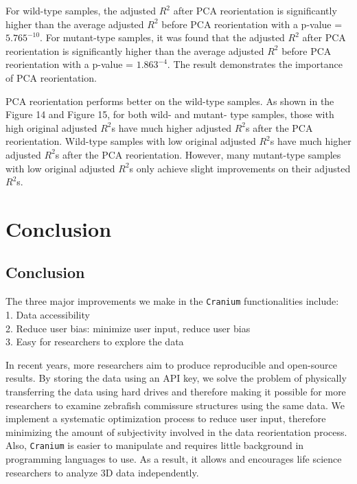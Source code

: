 \documentclass[10pt,letterpaper]{article}
\newenvironment{Shaded}{\begin{snugshade}}{\end{snugshade}}
\newcommand{\DataTypeTok}[1]{\textcolor[rgb]{0.13,0.29,0.53}{#1}}
\newcommand{\KeywordTok}[1]{\textcolor[rgb]{0.13,0.29,0.53}{\textbf{#1}}}
\newcommand{\NormalTok}[1]{#1}
\newcommand{\OperatorTok}[1]{\textcolor[rgb]{0.81,0.36,0.00}{\textbf{#1}}}
\newcommand{\OtherTok}[1]{\textcolor[rgb]{0.56,0.35,0.01}{#1}}
\newcommand{\StringTok}[1]{\textcolor[rgb]{0.31,0.60,0.02}{#1}}
\begin{document}
\begin{Shaded}
\end{Shaded}

For wild-type samples, the adjusted \(R^2\) after PCA reorientation is
significantly higher than the average adjusted \(R^2\) before PCA
reorientation with a p-value =\(5.765^{-10}\). For mutant-type samples,
it was found that the adjusted \(R^2\) after PCA reorientation is
significantly higher than the average adjusted \(R^2\) before PCA
reorientation with a p-value = \(1.863^{-4}\). The result demonstrates
the importance of PCA reorientation.

PCA reorientation performs better on the wild-type samples. As shown in
the Figure 14 and Figure 15, for both wild- and mutant- type samples,
those with high original adjusted \(R^2\)s have much higher adjusted
\(R^2\)s after the PCA reorientation. Wild-type samples with low
original adjusted \(R^2\)s have much higher adjusted \(R^2\)s after the
PCA reorientation. However, many mutant-type samples with low original
adjusted \(R^2\)s only achieve slight improvements on their adjusted
\(R^2\)s.

\hypertarget{conclusion}{%
\section{Conclusion}\label{conclusion}}

\hypertarget{conclusion-1}{%
\subsection{Conclusion}\label{conclusion-1}}

The three major improvements we make in the \texttt{Cranium}
functionalities include:\\
1. Data accessibility\\
2. Reduce user bias: minimize user input, reduce user bias\\
3. Easy for researchers to explore the data

In recent years, more researchers aim to produce reproducible and
open-source results. By storing the data using an API key, we solve the
problem of physically transferring the data using hard drives and
therefore making it possible for more researchers to examine zebrafish
commissure structures using the same data. We implement a systematic
optimization process to reduce user input, therefore minimizing the
amount of subjectivity involved in the data reorientation process. Also,
\texttt{Cranium} is easier to manipulate and requires little background
in programming languages to use. As a result, it allows and encourages
life science researchers to analyze 3D data independently.
\end{document}
